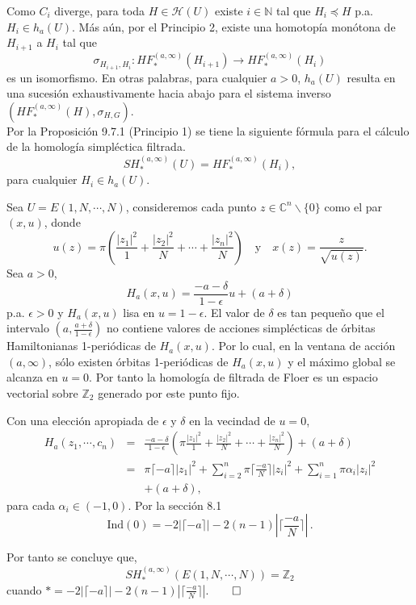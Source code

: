 \documentclass{beamer}
\begin{document}
\begin{frame}
Como $C_{i}$ diverge, para toda $H\in \mathcal{H}(U)$ existe $i\in \mathbb{N}$ tal que $H_{i}\preceq H$ p.a. $H_{i}\in h_{a}(U)$. M\'as a\'un, por el Principio 2, existe una homotop\'ia mon\'otona de $H_{i+1}$ a $H_{i}$ tal que $$\sigma_{H_{i+1},H_{i}}:HF_{\ast}^{(a,\infty)}(H_{i+1})\rightarrow HF_{\ast}^{(a,\infty)}(H_i)$$
es un isomorfismo. En otras palabras, para cualquier $a>0$, $h_{a}(U)$ resulta en una sucesi\'on exhaustivamente hacia abajo para el sistema inverso $(HF_{\ast}^{(a,\infty)}(H),\sigma_{H,G})$.\\
\vspace{1em}
Por la Proposici\'on 9.7.1 (Principio 1) se tiene la siguiente f\'ormula para el c\'alculo de la homolog\'ia simpl\'ectica filtrada.
$$SH_{\ast}^{(a,\infty)}(U)=HF_{\ast}^{(a,\infty)}(H_{i}),$$
para cualquier $H_{i}\in h_{a}(U)$.
\end{frame}

\begin{frame}
Sea $U=E(1,N,\cdots,N)$, consideremos cada punto $z\in \mathbb{C}^{n}\backslash \{0\}$ como el par $(x,u)$, donde 
$$u(z)=\pi\left(  \frac{|z_1|^2}{1}+\frac{|z_2|^2}{N}+\cdots+\frac{|z_n|^2}{N}\right)\hspace{1em}\mbox{y}\hspace{1em}x(z)=\frac{z}{\sqrt{u(z)}}.$$
$\,$\\
Sea $a>0$, $$H_{a}(x,u)=\frac{-a-\delta}{1-\epsilon}u+(a+\delta)$$
p.a. $\epsilon>0$ y $H_{a}(x,u)$ lisa en $u=1-\epsilon$. El valor de $\delta$ es tan peque\~no que el intervalo $(a,\frac{a+\delta}{1-\epsilon})$ no contiene valores de acciones simpl\'ecticas de \'orbitas Hamiltonianas 1-peri\'odicas de $H_{a}(x,u)$. Por lo cual, en la ventana de acci\'on $(a,\infty)$, s\'olo existen \'orbitas 1-peri\'odicas de $H_{a}(x,u)$ y el m\'aximo global se alcanza en $u=0$. Por tanto la homolog\'ia de filtrada de Floer es un espacio vectorial sobre $\mathbb{Z}_2$ generado por este punto fijo.
\end{frame}

\begin{frame}
Con una elecci\'on apropiada de $\epsilon$ y $\delta$ en la vecindad de $u=0$,
\begin{eqnarray*}
H_{a}(z_1,\cdots,c_n)&=&\frac{-a-\delta}{1-\epsilon}\left(  \pi \frac{|z_1|^2}{1}+\frac{|z_2|^2}{N}+\cdots+\frac{|z_n|^2}{N}\right)+(a+\delta)\\
&=&\pi\lceil -a\rceil |z_1|^2+\sum_{i=2}^{n}\pi\lceil \frac{-a}{N}\rceil |z_i|^2 + \sum_{i=1}^{n}\pi\alpha_{i}|z_i|^2\\
& &+(a+\delta),
\end{eqnarray*}
para cada $\alpha_i \in (-1,0)$. Por la secci\'on 8.1 $$\mbox{Ind}(0)=-2\big\vert \lceil -a \rceil \big\vert -2(n-1)|\lceil \frac{-a}{N}\rceil|\,.$$

\vspace{1em}
Por tanto se concluye que,
$$SH_{\ast}^{(a,\infty)}(E(1,N,\cdots,N))=\mathbb{Z}_{2}$$
cuando $\ast=-2\big\vert \lceil -a \rceil \big\vert -2(n-1)|\lceil \frac{-a}{N}\rceil |.$\hfill $\qed$
\end{frame}
\end{document}
